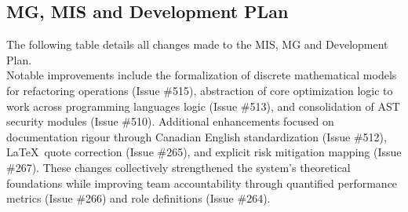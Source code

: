 \documentclass{article}
\begin{document}
\subsection{MG, MIS and Development PLan}

The following table details all changes made to the MIS, MG and Development Plan. \\

Notable improvements include the formalization of discrete mathematical models for %
refactoring operations (Issue \#515), abstraction of core optimization logic to work across programming languages %
logic (Issue \#513), and consolidation of AST security modules (Issue \#510). %
Additional enhancements focused on documentation rigour through Canadian English %
standardization (Issue \#512), \LaTeX\ quote correction (Issue \#265), and %
explicit risk mitigation mapping (Issue \#267). These changes collectively %
strengthened the system's theoretical foundations while improving team %
accountability through quantified performance metrics (Issue \#266) and %
role definitions (Issue \#264).
\end{document}
